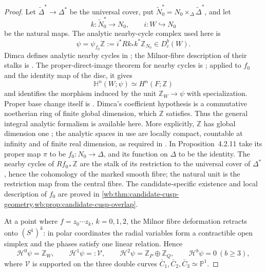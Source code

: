 \begin{proof}
Let \(\widetilde\Delta^*\to\Delta^*\) be the universal cover, put
\(\widetilde N_0^*=N_0\times_\Delta\widetilde\Delta^*\), and let
\[
 k:\widetilde N_0^*\longrightarrow N_0,
 \qquad i:W\hookrightarrow N_0
\]
be the natural maps.  The analytic nearby-cycle complex used here is
\[
 \psi=\psi_{f_0}\mathbb Z
 :=i^*Rk_*k^*\mathbb Z_{N_0}\in D_c^b(W).
\tag{IL.5.0}
\]
Dimca defines analytic nearby cycles in
\cite[Definition~4.2.1]{Dimca2004}; the Milnor-fibre description of their
stalks is \cite[Proposition~4.2.2]{Dimca2004}.  The proper-direct-image
theorem for nearby cycles is
\cite[Proposition~4.2.11]{Dimca2004}; applied to \(f_0\) and the identity
map of the disc, it gives
\[
 \mathbb H^n(W;\psi)\simeq H^n(F;\mathbb Z)
\]
and identifies the morphism induced by the unit
\(\mathbb Z_W\to\psi\) with specialization.  Proper base change itself is
\cite[Theorem~2.3.26]{Dimca2004}.  Dimca's coefficient hypothesis is a
commutative noetherian ring of finite global dimension, which
\(\mathbb Z\) satisfies.  Thus the general integral analytic formalism is
available here. More explicitly, $\mathbb Z$ has global dimension one
\cite[Example~3.1.2(ii)]{Dimca2004}; the analytic spaces in use are locally
compact, countable at infinity and of finite real dimension, as required
in \cite[\S3.1]{Dimca2004}. In Proposition~4.2.11 take its proper map
$\pi$ to be $f_0:N_0\to\Delta$, and its function on $\Delta$ to be the
identity. The nearby cycles of $Rf_{0*}\mathbb Z$ are the stalk of its
restriction to the universal cover of $\Delta^*$, hence the cohomology of
the marked smooth fibre; the natural unit is the restriction map from
the central fibre. The candidate-specific existence and local description of
\(f_0\) are proved in \cref{wb:thm:candidate-cusp-geometry,wb:prop:candidate-cusp-overlap}.

At a point where \(f=z_0\cdots z_k\), \(k=0,1,2\), the Milnor fibre
deformation retracts onto \((S^1)^k\): in polar coordinates the radial
variables form a contractible open simplex and the phases satisfy one linear
relation.  Hence
\[
 \mathcal H^0\psi=\mathbb Z_W,\qquad
 \mathcal H^1\psi=:\mathscr V,\qquad
 \mathcal H^2\psi=\mathbb Z_P\oplus\mathbb Z_Q,\qquad
 \mathcal H^b\psi=0\ (b\ge3),
\tag{IL.5.2}
\]
where \(\mathscr V\) is supported on the three double curves
\(\bar C_1,\bar C_2,\bar C_3\simeq\mathbb P^1\).


\end{proof}
